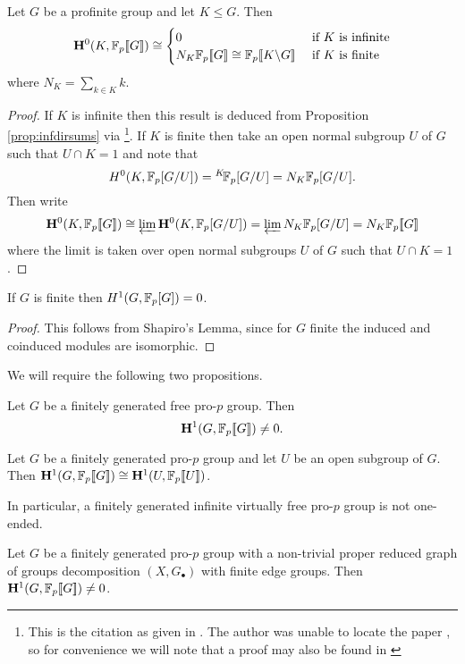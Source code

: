 \documentclass[draft, a4paper]{article}
\begin{document}
\begin{lem}
Let $G$ be a profinite group and let $K\leq G$. Then 
\[{\bf H}^0(K, {\mathbb{F}_p[\![G]\!]})\cong\begin{cases}
0 & \text{ if $K$ is infinite}\\ N_K{\mathbb{F}_p[\![G]\!]} \cong {\ensuremath{\mathbb{F}_p[\![K\backslash G]\!]}}& \text{ if $K$ is finite}
\end{cases} \]
where $N_K = \sum_{k\in K} k$.
\end{lem}
\begin{proof}
If $K$ is infinite then this result is deduced from Proposition \ref{prop:infdirsums} via \cite[Lemma 3]{MS02}\footnote{This is the citation as given in \cite{Korenev04}. The author was unable to locate the paper \cite{MS02}, so for convenience we will note that a proof may also be found in \cite[Proposition B.1]{Wilkes19RelCoh}}. If $K$ is finite then take an open normal subgroup $U$ of $G$ such that $U\cap K = 1$ and note that 
\[H^0(K, \mathbb{F}_p[G/U]) = {}^K\!\mathbb{F}_p[G/U] = N_K\mathbb{F}_p[G/U].\]
Then write 
\[{\bf H}^0(K, {\mathbb{F}_p[\![G]\!]}) \cong \varprojlim {\bf H}^0(K,\mathbb{F}_p[G/U]) = \varprojlim N_K\mathbb{F}_p[G/U] = N_K {\mathbb{F}_p[\![G]\!]} \]
where the limit is taken over open normal subgroups $U$ of $G$ such that $U\cap K=1$.
\end{proof}
\begin{lem}
If $G$ is finite then $H^1(G,\mathbb{F}_p[G])=0$.
\end{lem}
\begin{proof}
This follows from Shapiro's Lemma, since for $G$ finite the induced and coinduced modules are isomorphic.
\end{proof}
We will require the following two propositions.
\begin{prop}
Let $G$ be a finitely generated free pro-$p$ group. Then \[{\bf H}^1(G,{\mathbb{F}_p[\![G]\!]})\neq 0.\]
\end{prop}
\begin{prop}
Let $G$ be a finitely generated pro-$p$ group and let $U$ be an open subgroup of $G$. Then ${\bf H}^1(G,{\mathbb{F}_p[\![G]\!]})\cong {\bf H}^1(U,{\mathbb{F}_p[\![U]\!]})$.
\end{prop}
In particular, a finitely generated infinite virtually free pro-$p$ group is not one-ended.
\begin{prop}\label{prop_more}
Let $G$ be a finitely generated pro-$p$ group with a non-trivial proper reduced graph of groups decomposition $(X,G_\bullet)$ with finite edge groups. Then ${\bf H}^1(G,{\mathbb{F}_p[\![G]\!]})\neq 0$.
\end{prop}
\end{document}
